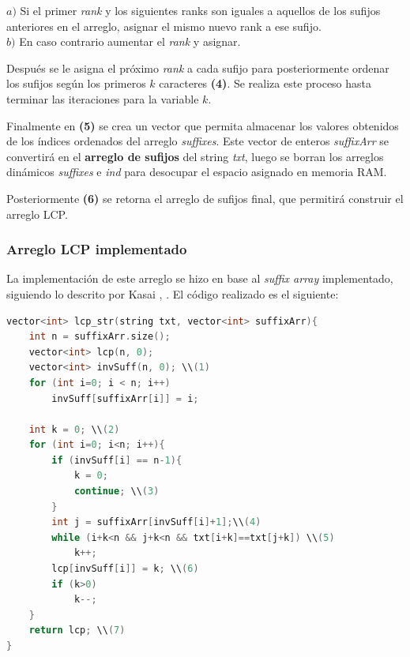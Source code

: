 $a)$ Si el primer \textit{rank} y los siguientes ranks son iguales a aquellos de los sufijos anteriores en el arreglo, asignar el mismo nuevo rank a ese sufijo.\\
$b)$ En caso contrario aumentar el \textit{rank} y asignar.

Después se le asigna el próximo \textit{rank} a cada sufijo para posteriormente ordenar los sufijos según los primeros $k$ caracteres \textbf{(4)}. Se realiza este proceso hasta terminar las iteraciones para la variable $k$.

Finalmente en \textbf{(5)} se crea un vector que permita almacenar los valores obtenidos de los índices ordenados del arreglo \textit{suffixes}. Este vector de enteros \textit{suffixArr} se convertirá en el \textbf{arreglo de sufijos} del string \textit{txt}, luego se borran los arreglos dinámicos \textit{suffixes} e \textit{ind} para desocupar el espacio asignado en memoria RAM.

Posteriormente \textbf{(6)} se retorna el arreglo de sufijos final, que permitirá construir el arreglo LCP.

\subsubsection{Arreglo LCP implementado}

La implementación de este arreglo se hizo en base al \textit{suffix array} implementado, siguiendo lo descrito por Kasai \cite{kasaimethod}, \cite{kasai}. El código realizado es el siguiente:

\begin{lstlisting}[language=C++, caption=Función principal arreglo LCP (1)]
vector<int> lcp_str(string txt, vector<int> suffixArr){
	int n = suffixArr.size();
	vector<int> lcp(n, 0);
	vector<int> invSuff(n, 0); \\(1)
	for (int i=0; i < n; i++)
		invSuff[suffixArr[i]] = i;

	int k = 0; \\(2)
	for (int i=0; i<n; i++){
		if (invSuff[i] == n-1){
			k = 0;
			continue; \\(3)
		}
		int j = suffixArr[invSuff[i]+1];\\(4)
		while (i+k<n && j+k<n && txt[i+k]==txt[j+k]) \\(5)
			k++;
		lcp[invSuff[i]] = k; \\(6)
		if (k>0)
			k--;
	}
	return lcp; \\(7)
}

\end{lstlisting}

